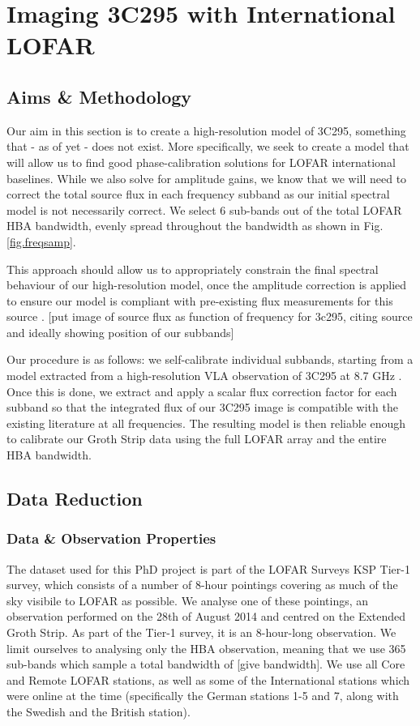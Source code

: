 \chapter{Imaging 3C295 with International LOFAR}\label{section.3c295}
\minitoc
\section{Aims \& Methodology}
\pg
Our aim in this section is to create a high-resolution model of 3C295, something that - as
of yet - does not exist. More specifically, we seek to create a model that will allow us to find
good phase-calibration solutions for LOFAR international baselines. While we also solve for
amplitude gains, we know that we will need to correct the total source flux in each frequency
subband as our initial spectral model is not necessarily correct.
We select 6 sub-bands out of the total LOFAR HBA bandwidth, evenly spread throughout the bandwidth as shown in Fig. \ref{fig.freqsamp}.

\pg
This approach should allow us to appropriately constrain the final spectral behaviour of our high-resolution model, once the amplitude correction is applied to ensure our model is compliant with pre-existing flux measurements for this source . [put image of source flux as function of frequency for 3c295, citing source and ideally showing position of our subbands]

\pg
Our procedure is as follows: we self-calibrate individual subbands, starting from a model
extracted from a high-resolution VLA observation of 3C295 at 8.7 GHz . Once this is done,
we extract and apply a scalar flux correction factor for each subband so that the integrated flux of our 3C295 image is compatible with the existing literature at all frequencies. The resulting model is then reliable enough to calibrate our Groth Strip data using the full LOFAR array and the entire HBA bandwidth.

\section{Data Reduction}

\subsection{Data \& Observation Properties}
\pg
The dataset used for this PhD project is part of the LOFAR Surveys KSP Tier-1 survey, which consists of a number of 8-hour pointings covering as much of the sky visibile to LOFAR as possible. We analyse one of these pointings, an observation performed on the 28th of August 2014 and centred on the Extended Groth Strip. As part of the Tier-1 survey, it is an 8-hour-long observation. We limit ourselves to analysing only the HBA observation, meaning that we use 365 sub-bands which sample a total bandwidth of [give bandwidth]. We use all Core and Remote LOFAR stations, as well as some of the International stations which were online at the time (specifically the German stations 1-5 and 7, along with the Swedish and the British station).

